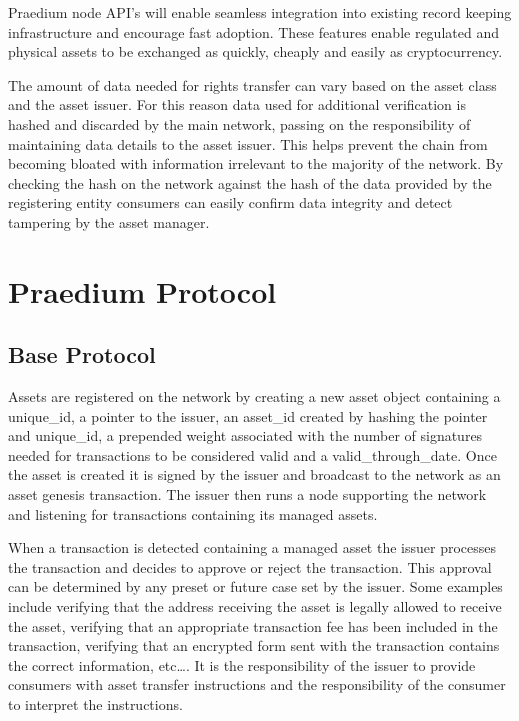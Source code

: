 \documentclass[12pt]{article}
\begin{document}
Praedium node API’s will enable seamless integration into 
existing record keeping infrastructure and encourage fast adoption. These 
features enable regulated and physical assets to be exchanged as quickly, cheaply
and easily as cryptocurrency.

The amount of data needed for rights transfer can vary based on the asset class
and the asset issuer.
For this reason data used for additional verification is hashed and discarded by the
main network, passing on the responsibility of maintaining data details to
the asset issuer. 
This helps prevent the chain from becoming bloated with information irrelevant 
to the majority of the network.  By checking the hash on the network against 
the hash of the data provided by the registering entity consumers can easily 
confirm data integrity and detect tampering by the asset manager.


\section{Praedium Protocol}
\subsection{Base Protocol}
Assets are registered on the network by creating a new asset object containing 
a unique\_id, a pointer to the issuer, an asset\_id created by hashing the pointer 
and unique\_id, a prepended weight associated with the number of signatures needed 
for transactions to be considered valid and a valid\_through\_date.  Once the asset 
is created it is signed by the issuer and broadcast to the network as an asset 
genesis transaction. The issuer then runs a node supporting the network and listening 
for transactions containing its managed assets.

When a transaction is detected containing a managed asset the issuer processes the 
transaction and decides to approve or reject the transaction.  This approval can be 
determined by any preset or future case set by the issuer.  Some examples include 
verifying that the address receiving the asset is legally allowed to receive the asset, 
verifying that an appropriate transaction fee has been included in the transaction, 
verifying that an encrypted form sent with the transaction contains the correct 
information, etc….  It is the responsibility of the issuer to provide consumers with 
asset transfer instructions and the responsibility of the consumer to interpret
the instructions.
\end{document}
